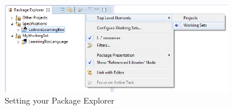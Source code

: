 \vspace{0.5cm}

\begin{figure}[h!]
	\centering
  \includegraphics[width=0.9\textwidth]{eclipse_workingSets}
	\caption{Setting your Package Explorer}
	\label{fig:workingSets}
\end{figure}





